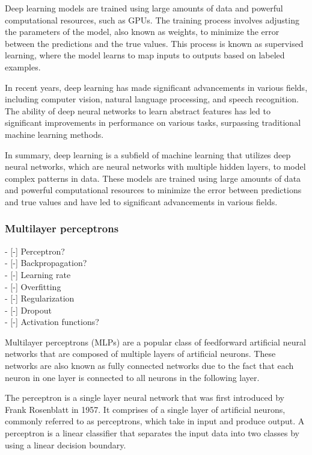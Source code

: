 Deep learning models are trained using large amounts of data and powerful computational resources, such as GPUs. The training process involves adjusting the parameters of the model, also known as weights, to minimize the error between the predictions and the true values. This process is known as supervised learning, where the model learns to map inputs to outputs based on labeled examples.

In recent years, deep learning has made significant advancements in various fields, including computer vision, natural language processing, and speech recognition. The ability of deep neural networks to learn abstract features has led to significant improvements in performance on various tasks, surpassing traditional machine learning methods.

In summary, deep learning is a subfield of machine learning that utilizes deep neural networks, which are neural networks with multiple hidden layers, to model complex patterns in data. These models are trained using large amounts of data and powerful computational resources to minimize the error between predictions and true values and have led to significant advancements in various fields.

\subsubsection{Multilayer perceptrons}
- [-] Perceptron?\\
- [-] Backpropagation?\\
- [-] Learning rate\\
- [-] Overfitting\\
- [-] Regularization\\
- [-] Dropout\\
- [-] Activation functions?

Multilayer perceptrons (MLPs) are a popular class of feedforward artificial neural networks that are composed of multiple layers of artificial neurons. These networks are also known as fully connected networks due to the fact that each neuron in one layer is connected to all neurons in the following layer.

The perceptron is a single layer neural network that was first introduced by Frank Rosenblatt in 1957. It comprises of a single layer of artificial neurons, commonly referred to as perceptrons, which take in input and produce output. A perceptron is a linear classifier that separates the input data into two classes by using a linear decision boundary.

